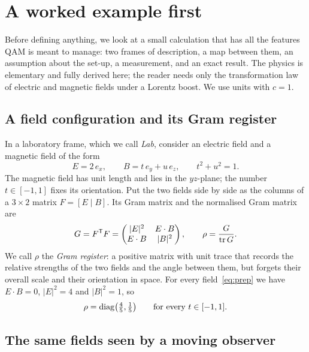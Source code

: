 \section{A worked example first}\label{sec:example}

Before defining anything, we look at a small calculation that has all the features QAM is meant to manage: two frames of description,
a map between them, an assumption about the set-up, a measurement, and an exact result. The physics is elementary and fully derived
here; the reader needs only the transformation law of electric and magnetic fields under a Lorentz boost. We use units with $c=1$.

\subsection{A field configuration and its Gram register}

In a laboratory frame, which we call \emph{Lab}, consider an electric field and a magnetic field of the form
\begin{equation}\label{eq:prep}
E = 2\,e_x,\qquad B = t\,e_y + u\,e_z,\qquad t^2+u^2 = 1 .
\end{equation}
The magnetic field has unit length and lies in the $yz$-plane; the number $t\in[-1,1]$ fixes its orientation. Put the two fields
side by side as the columns of a $3\times2$ matrix $F=[E\mid B]$. Its Gram matrix and the normalised Gram matrix are
\[
G = F^{\mathsf T}F = \begin{pmatrix} |E|^2 & E\cdot B\\ E\cdot B & |B|^2\end{pmatrix},\qquad
\rho = \frac{G}{\operatorname{tr} G}.
\]
We call $\rho$ the \emph{Gram register}: a positive matrix with unit trace that records the relative strengths of the two fields and
the angle between them, but forgets their overall scale and their orientation in space. For every field~\eqref{eq:prep} we have
$E\cdot B=0$, $|E|^2=4$ and $|B|^2=1$, so
\begin{equation}\label{eq:rho-lab}
\rho = \operatorname{diag}\bigl(\tfrac45,\tfrac15\bigr)\qquad\text{for every } t\in[-1,1].
\end{equation}

\subsection{The same fields seen by a moving observer}

